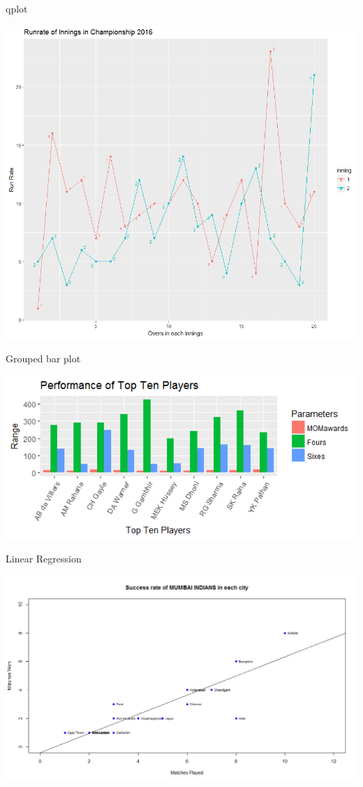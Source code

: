 \documentclass[14pt]{beamer}
\begin{document}
\begin{frame}{qplot}
  \begin{center}
    \includegraphics[scale=0.350]{Rplot21.png}
  \end{center}
\end{frame}
\begin{frame}{Grouped bar plot}
  
    \includegraphics[scale=0.75]{Rplot07.png}
  
\end{frame}
\begin{frame}{Linear Regression}
  \begin{center}
    \includegraphics[scale=0.32]{regression_MI.png}
  \end{center}
\end{frame}
\end{document}
